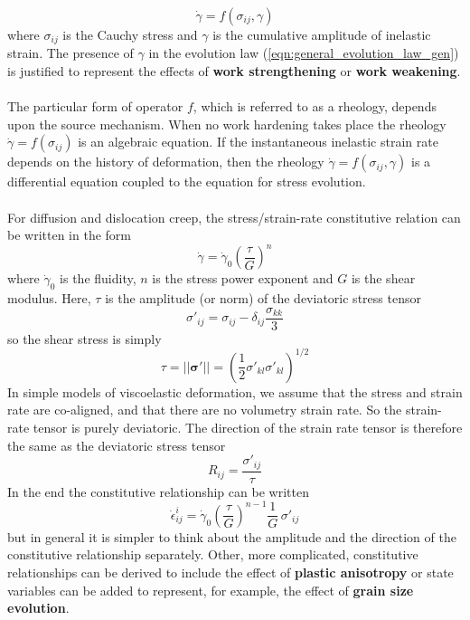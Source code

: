 \documentclass[letterpaper,12pt,]{memoir}
\begin{document}
\begin{equation}\label{eqn:general_evolution_law_gen}
\dot{\gamma}=f(\sigma_{ij},\gamma)
\end{equation}
where $\sigma_{ij}$ is the Cauchy stress and $\gamma$ is the cumulative amplitude of inelastic strain. The presence of $\gamma$ in the evolution law (\ref{eqn:general_evolution_law_gen}) is justified to represent the effects of \textbf{work strengthening} or \textbf{work weakening}. \\
\\
The particular form of operator $f$, which is referred to as a rheology, depends upon the source mechanism. When no work hardening takes place the rheology $\dot{\gamma}=f(\sigma_{ij})$ is an algebraic equation. If the instantaneous inelastic strain rate depends on the history of deformation, then the rheology $\dot{\gamma}=f(\sigma_{ij},\gamma)$ is a differential equation coupled to the equation for stress evolution. \\
\\
For diffusion and dislocation creep, the stress/strain-rate constitutive relation can be written in the form
\begin{equation}
\dot{\gamma}=\dot{\gamma}_0\left(\frac{\tau}{G}\right)^{n}
\end{equation}
where $\dot{\gamma}_0$ is the fluidity, $n$ is the stress power exponent and $G$ is the shear modulus. Here, $\tau$ is the amplitude (or norm) of the deviatoric stress tensor
\begin{equation}
\sigma'_{ij}=\sigma_{ij}-\delta_{ij}\frac{\sigma_{kk}}{3}
\end{equation} 
so the shear stress is simply
\begin{equation}
\tau=\big|\big|\boldsymbol{\sigma}'\big|\big|=\left(\frac{1}{2}\sigma'_{kl}\sigma'_{kl}\right)^{1/2}
\end{equation} 
In simple models of viscoelastic deformation, we assume that the stress and strain rate are co-aligned, and that there are no volumetry strain rate. So the strain-rate tensor is purely deviatoric. The direction of the strain rate tensor is therefore the same as the deviatoric stress tensor
\begin{equation}
R_{ij}=\frac{\sigma'_{ij}}{\tau}
\end{equation}
In the end the constitutive relationship can be written
\begin{equation}
\dot{\epsilon}_{ij}^i=\dot{\gamma}_0\left(\frac{\tau}{G}\right)^{n-1}\frac{1}{G}\,\sigma'_{ij}
\end{equation}
but in general it is simpler to think about the amplitude and the direction of the constitutive relationship separately. Other, more complicated, constitutive relationships can be derived to include the effect of \textbf{plastic anisotropy} or state variables can be added to represent, for example, the effect of \textbf{grain size evolution}.
\end{document}
